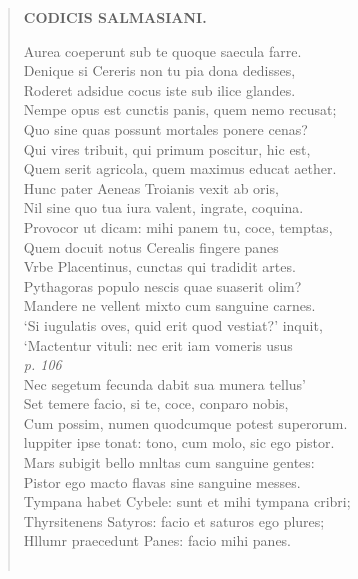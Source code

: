 \documentclass[11pt, a4paper]{report}
\begin{document}
\begin{verse}
    \begin{center} \textbf{CODICIS SALMASIANI.} \end{center} \marginpar{[167]} Aurea coeperunt sub te quoque saecula farre. \\ Denique si Cereris non tu pia dona dedisses, \\ Roderet adsidue cocus iste sub ilice glandes. \\ Nempe opus est cunctis panis, quem nemo recusat; \\ Quo sine quas possunt mortales ponere cenas? \\ Qui vires tribuit, qui primum poscitur, hic est, \\ Quem serit agricola, quem maximus educat aether. \\ Hunc pater Aeneas Troianis vexit ab oris, \\ Nil sine quo tua iura valent, ingrate, coquina. \\ Provocor ut dicam: mihi panem tu, coce, temptas, \\ Quem docuit notus Cerealis fingere panes \\ Vrbe Placentinus, cunctas qui tradidit artes. \\ Pythagoras populo nescis quae suaserit olim? \\ Mandere ne vellent mixto cum sanguine carnes. \\ ‘Si iugulatis oves, quid erit quod vestiat?’ inquit, \\ ‘Mactentur vituli: nec erit iam vomeris usus \\ \textit{p. 106} \\ Nec segetum fecunda dabit sua munera tellus’ \\ Set temere facio, si te, coce, conparo nobis, \\ Cum possim, numen quodcumque potest superorum. \\ luppiter ipse tonat: tono, cum molo, sic ego pistor. \\ Mars subigit bello mnltas cum sanguine gentes: \\ Pistor ego macto flavas sine sanguine messes. \\ Tympana habet Cybele: sunt et mihi tympana cribri; \\ Thyrsitenens Satyros: facio et saturos ego plures; \\ Hllumr praecedunt Panes: facio mihi panes. \\ 
        ﻿\pagebreak 

\end{verse}
\end{document}
